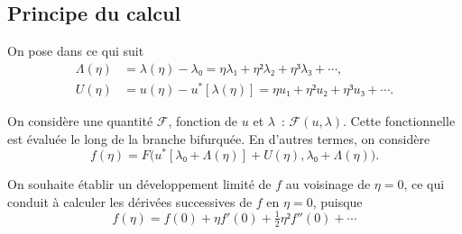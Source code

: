 \documentclass[12pt, final]{amsart}
\begin{document}
\subsection{Principe du calcul}
\label{sec:20220107121442}

On pose dans ce qui suit
\begin{align}
  \label{eq:20211112155446}
  Λ(η)&=λ(η)-λ₀=ηλ₁+η²λ₂+η³λ₃+\cdots,\\
  \label{eq:20211112113028}
  U(η)&=u(η)-u^*[λ(η)]=ηu₁+η²u₂+η³u₃+\cdots.
\end{align}

On considère une quantité \(ℱ\), fonction de \(u\) et \(λ\)~: \(ℱ(u,
λ)\). Cette fonctionnelle est évaluée le long de la branche bifurquée. En
d'autres termes, on considère
\begin{equation}
  f(η)=F\bigl(u^*[λ₀+Λ(η)]+U(η), λ₀+Λ(η)\bigr).
\end{equation}

On souhaite établir un développement limité de \(f\) au voisinage de \(η=0\),
ce qui conduit à calculer les dérivées successives de \(f\) en \(η=0\), puisque
\begin{equation}
  f(η)=f(0)+η f'(0)+\tfrac12η²f''(0)+\cdots
\end{equation}
\end{document}
